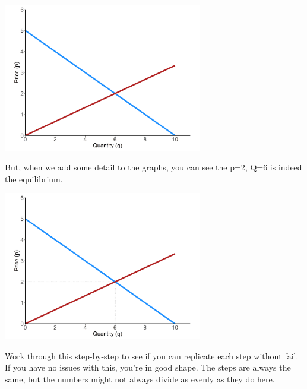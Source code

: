 \documentclass[11pt,]{article}
\begin{document}
\begin{center}
\includegraphics[width=0.65\textwidth]{../images/eg_both.png}
\end{center}

But, when we add some detail to the graphs, you can see the p=2, Q=6 is
indeed the equilibrium.

\begin{center}
\includegraphics[width=0.65\textwidth]{../images/eg_equil.png}
\end{center}

Work through this step-by-step to see if you can replicate each step
without fail. If you have no issues with this, you're in good shape. The
steps are always the same, but the numbers might not always divide as
evenly as they do here.
\end{document}

